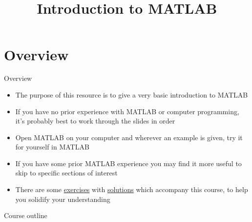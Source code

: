 \documentclass{beamer}
\title{Introduction to MATLAB}
\date{} %
\begin{document}
\begin{frame}
\titlepage
\end{frame}

\section{Overview}
\begin{frame}{Overview}
	\begin{itemize}
		\item The purpose of this resource is to give a very basic introduction to MATLAB
		\item If you have no prior experience with MATLAB or computer programming, it's probably best to work through the slides in order
		\item Open MATLAB on your computer and wherever an example is given, try it for yourself in MATLAB
		\item If you have some prior MATLAB experience you may find it more useful to skip to specific sections of interest
		\item There are some \href{http://wiki.rac.manchester.ac.uk/community/MATLAB/IntroExercises}{exercises} with \href{http://wiki.rac.manchester.ac.uk/community/MATLAB/IntroSolutions}{solutions} which accompany this course, to help you solidify your understanding
	\end{itemize}
\end{frame}

\begin{frame}{Course outline}
	\begin{multicols}{2}
		\tableofcontents
	\end{multicols}	
\end{frame}
\end{document}
